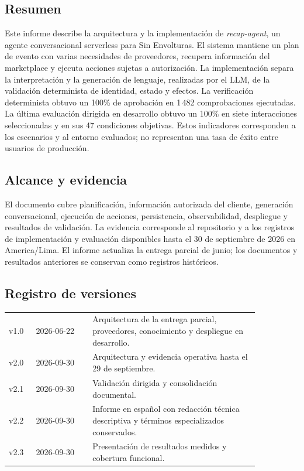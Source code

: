 \documentclass[
	a4paper,
	12pt,
]{CSSullivanBusinessReport}
\begin{document}
\thispagestyle{empty}
\begin{twothirdswidth}
\footnotesize
\subsection*{Resumen}
Este informe describe la arquitectura y la implementación de \textit{recap-agent}, un agente conversacional serverless para Sin Envolturas. El sistema mantiene un plan de evento con varias necesidades de proveedores, recupera información del marketplace y ejecuta acciones sujetas a autorización. La implementación separa la interpretación y la generación de lenguaje, realizadas por el LLM, de la validación determinista de identidad, estado y efectos. La verificación determinista obtuvo un 100\% de aprobación en 1\,482 comprobaciones ejecutadas. La última evaluación dirigida en desarrollo obtuvo un 100\% en siete interacciones seleccionadas y en sus 47 condiciones objetivas. Estos indicadores corresponden a los escenarios y al entorno evaluados; no representan una tasa de éxito entre usuarios de producción.

\subsection*{Alcance y evidencia}
El documento cubre planificación, información autorizada del cliente, generación conversacional, ejecución de acciones, persistencia, observabilidad, despliegue y resultados de validación. La evidencia corresponde al repositorio y a los registros de implementación y evaluación disponibles hasta el 30 de septiembre de 2026 en America/Lima. El informe actualiza la entrega parcial de junio; los documentos y resultados anteriores se conservan como registros históricos.

\subsection*{Registro de versiones}
\scriptsize
\begin{tabular}{@{} L{0.09\linewidth} L{0.19\linewidth} L{0.57\linewidth} @{}}
\toprule
v1.0 & 2026-06-22 & Arquitectura de la entrega parcial, proveedores, conocimiento y despliegue en desarrollo.\\
v2.0 & 2026-09-30 & Arquitectura y evidencia operativa hasta el 29 de septiembre.\\
v2.1 & 2026-09-30 & Validación dirigida y consolidación documental.\\
v2.2 & 2026-09-30 & Informe en español con redacción técnica descriptiva y términos especializados conservados.\\
v2.3 & 2026-09-30 & Presentación de resultados medidos y cobertura funcional.\\
\bottomrule
\end{tabular}
\end{twothirdswidth}
\newpage
\begin{twothirdswidth}\tableofcontents\end{twothirdswidth}
\newpage
\end{document}
